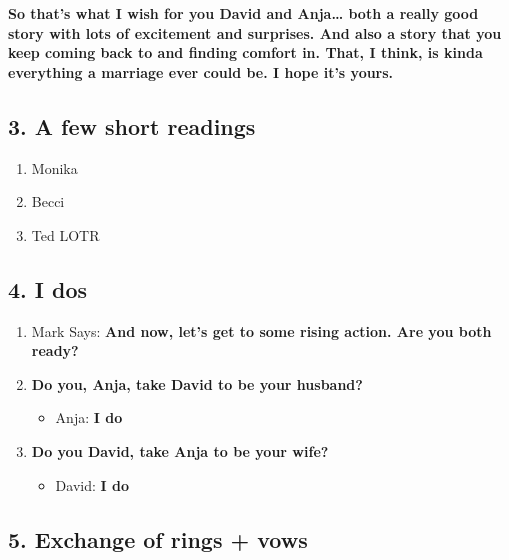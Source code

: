 \textbf{So that's what I wish for you David and Anja\ldots{} both a
really good story with lots of excitement and surprises. And also a
story that you keep coming back to and finding comfort in. That, I
think, is kinda everything a marriage ever could be. I hope it's yours.}

\hypertarget{a-few-short-readings}{%
\subsection{3. A few short readings}\label{a-few-short-readings}}

\begin{enumerate}
\def\labelenumi{\arabic{enumi}.}
\tightlist
\item
  Monika
\item
  Becci
\item
  Ted LOTR
\end{enumerate}

\hypertarget{i-dos}{%
\subsection{4. I dos}\label{i-dos}}

\begin{enumerate}
\def\labelenumi{\arabic{enumi}.}
\tightlist
\item
  Mark Says: \textbf{And now, let's get to some rising action. Are you
  both ready?}
\item
  \textbf{Do you, Anja, take David to be your husband?}

  \begin{itemize}
  \tightlist
  \item
    Anja: \textbf{I do}
  \end{itemize}
\item
  \textbf{Do you David, take Anja to be your wife?}

  \begin{itemize}
  \tightlist
  \item
    David: \textbf{I do}
  \end{itemize}
\end{enumerate}

\hypertarget{exchange-of-rings-vows}{%
\subsection{5. Exchange of rings + vows}\label{exchange-of-rings-vows}}

